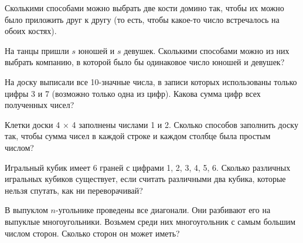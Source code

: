 \documentclass{article}
\begin{document}
\begin{enumerate_boxed}
        \item Сколькими способами можно выбрать две кости домино так, чтобы их можно было приложить друг к другу (то есть, чтобы какое-то число встречалось на обоих костях).

        \item На танцы пришли $s$ юношей и $s$ девушек.
        Сколькими способами можно из них выбрать компанию, в которой было бы одинаковое число юношей и девушек?

        \item На доску выписали все 10-значные числа, в записи которых использованы только цифры 3 и 7 (возможно только одна из цифр).
        Какова сумма цифр всех полученных чисел?
        \item Клетки доски 4 × 4 заполнены числами 1 и 2.
        Сколько способов заполнить доску так, чтобы сумма чисел в каждой строке и каждом столбце была простым числом?
        \item Игральный кубик имеет 6 граней с цифрами 1, 2, 3, 4, 5, 6.
        Сколько различных игральных кубиков существует, если считать различными два кубика, которые нельзя спутать, как ни переворачивай?
        \item В выпуклом $n$-угольнике проведены все диагонали.
        Они разбивают его на выпуклые многоугольники.
        Возьмем среди них многоугольник с самым большим числом сторон.
        Сколько сторон он может иметь?


    \end{enumerate_boxed}
\end{document}

